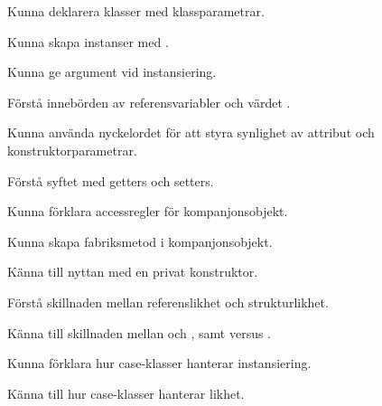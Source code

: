 

\item Kunna deklarera klasser med klassparametrar.
\item Kunna skapa instanser med .
\item Kunna ge argument vid instansiering.
\item Förstå innebörden av referensvariabler och värdet .

\item Kunna använda nyckelordet  för att styra synlighet av attribut och konstruktorparametrar.

\item Förstå syftet med getters och setters.
\item Kunna förklara accessregler för kompanjonsobjekt.
\item Kunna skapa fabriksmetod i kompanjonsobjekt.
\item Känna till nyttan med en privat konstruktor.

\item Förstå skillnaden mellan referenslikhet och strukturlikhet.
\item Känna till skillnaden mellan \code{==} och , samt \code{!=} versus .

\item Kunna förklara hur case-klasser hanterar instansiering.
\item Känna till hur case-klasser hanterar likhet.
